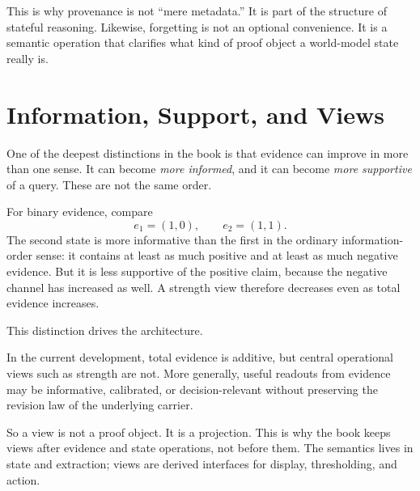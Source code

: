 
This is why provenance is not ``mere metadata.''  It is part of the structure of
stateful reasoning.  Likewise, forgetting is not an optional convenience.  It is a
semantic operation that clarifies what kind of proof object a world-model
state really is.

\section{Information, Support, and Views}
\label{sec:overview-views}

One of the deepest distinctions in the book is that evidence can improve in
more than one sense.  It can become \emph{more informed}, and it can become
\emph{more supportive} of a query.  These are not the same order.

For binary evidence, compare
\[
  e_1 = (1,0),
  \qquad
  e_2 = (1,1).
\]
The second state is more informative than the first in the ordinary
information-order sense: it contains at least as much positive and at least as
much negative evidence.  But it is less supportive of the positive claim,
because the negative channel has increased as well.  A strength view therefore
decreases even as total evidence increases.

This distinction drives the architecture.

\begin{proposition}
\label{prop:overview-views-not-semantic-core}
In the current development, total evidence is additive, but central operational
views such as strength are not.  More generally, useful readouts from evidence
may be informative, calibrated, or decision-relevant without preserving the
revision law of the underlying carrier.
\end{proposition}

So a view is not a proof object.  It is a projection.  This is why the book keeps
views after evidence and state operations, not before them.  The semantics lives
in state and extraction; views are derived interfaces for display, thresholding,
and action.

